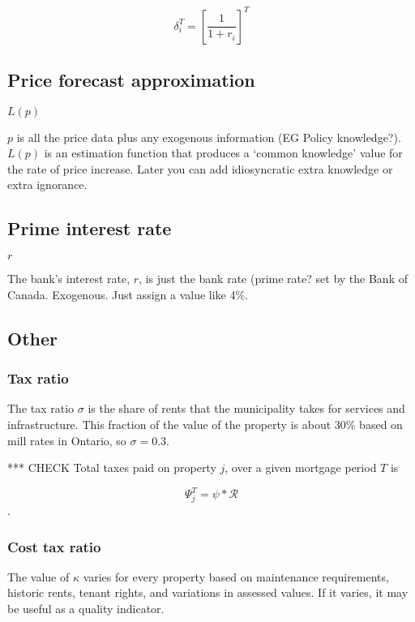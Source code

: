 \[\delta^T_i=\left[\frac{1}{1+r_i}\right]^T\]



\subsection{Price forecast approximation} \label{SS:PriceForecast}
$L(p)$

$p$ is all the price data plus any exogenous information (EG Policy knowledge?). $L(p)$ is an estimation function that produces a `common knowledge' value for the rate of price increase. Later you can add idiosyncratic extra knowledge or extra ignorance.



\subsection{Prime interest rate}\label{SS:BankRate}
$r$

The bank's interest rate, $r$, is just the bank rate (prime rate? set by the Bank of Canada. Exogenous. Just assign  a value like 4\%.



\subsection{Other}
\subsubsection{Tax ratio}\label{SS:taxratio} 
The tax ratio $\sigma$ is the share of rents that the municipality takes for services and infrastructure. This fraction of the value of the property is about 30\% based on mill rates in Ontario,  so $\sigma = 0.3$. %

*** CHECK Total taxes paid on  property $j$, over a given mortgage period $T$ is 

\[\Psi_j^T = \psi * \mathcal{R}\].  



\subsubsection{Cost tax ratio}\label{SS:costratio} 
The value of $\kappa$  varies for every property based on maintenance requirements, historic rents, tenant rights, and variations in assessed values. If it varies, it may be useful as a quality indicator.


